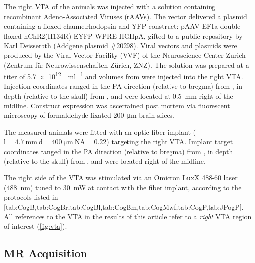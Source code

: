 The right VTA of the animals was injected with a solution containing recombinant Adeno-Associated Viruses (rAAVs).
The vector delivered a plasmid containing a floxed channelrhodopsin and YFP construct:
pAAV-EF1a-double floxed-hChR2(H134R)-EYFP-WPRE-HGHpA, gifted to a public repository by Karl Deisseroth (\href{https://www.addgene.org/20298/}{Addgene plasmid \#20298}).
Viral vectors and plasmids were produced by the Viral Vector Facility (VVF) of the Neuroscience Center Zurich (Zentrum für Neurowissenschaften Zürich, ZNZ).
The solution was prepared at a titer of \SI{5.7e12}{\vg\per\milli\litre} and volumes from
were injected into the right VTA.
Injection coordinates ranged in the PA direction (relative to bregma) from
,
in depth (relative to the skull) from
,
and were located at \SI{0.5}{\milli\meter} right of the midline.
Construct expression was ascertained post mortem via fluorescent microscopy of formaldehyde fixated \SI{200}{\micro\metre} brain slices.

The measured animals were fitted with an optic fiber implant ($\mathrm{l=\SI{4.7}{\milli\meter} \ d=\SI{400}{\micro\meter} \ NA=0.22}$) targeting the right VTA.
Implant target coordinates ranged in the PA direction (relative to bregma) from
,
in depth (relative to the skull) from
,
and were located
right of the midline.

The right side of the VTA was stimulated via an Omicron LuxX 488-60 laser (\SI{488}{\nano\meter}) tuned to \SI{30}{\milli\watt} at contact with the fiber implant, according to the protocols listed in \cref{tab:CogB,tab:CogBr,tab:CogBl,tab:CogBm,tab:CogMwf,tab:CogP,tab:JPogP}.
All references to the VTA in the results of this article refer to a \textit{right} VTA region of interest (\cref{fig:vta}).

\subsection{MR Acquisition}

